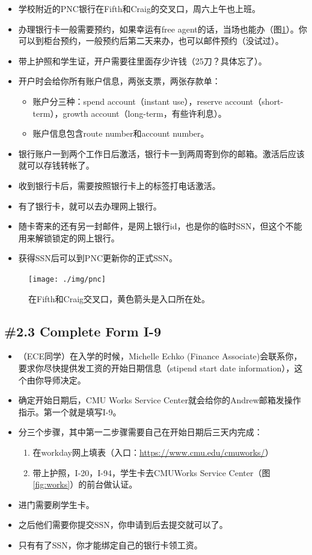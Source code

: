 \documentclass[letterpaper,10pt]{article}
\begin{document}
	\begin{itemize}
		\item 学校附近的PNC银行在Fifth和Craig的交叉口，周六上午也上班。
		\item 办理银行卡一般需要预约，如果幸运有free agent的话，当场也能办（图\ref{fig:pnc}）。你可以到柜台预约，一般预约后第二天来办，也可以邮件预约（没试过）。
		\item 带上护照和学生证，开户需要往里面存少许钱（25刀？具体忘了）。
		\item 开户时会给你所有账户信息，两张支票，两张存款单：
		\begin{itemize}
			\item 账户分三种：spend account（instant use），reserve account（short-term），growth account（long-term，有些许利息）。
			\item 账户信息包含route number和account number。
		\end{itemize}
		\item 银行账户一到两个工作日后激活，银行卡一到两周寄到你的邮箱。激活后应该就可以存钱转帐了。
		\item 收到银行卡后，需要按照银行卡上的标签打电话激活。
		\item 有了银行卡，就可以去办理网上银行。
		\item 随卡寄来的还有另一封邮件，是网上银行id，也是你的临时SSN，但这个不能用来解锁锁定的网上银行。
		\item 获得SSN后可以到PNC更新你的正式SSN。
	\end{itemize}
	
	\begin{figure}[!h]
		\centering
		\texttt{[image: ./img/pnc]}
		\caption{在Fifth和Craig交叉口，黄色箭头是入口所在处。}
		\label{fig:pnc}
	\end{figure}
	
	\subsection*{\#2.3 Complete Form I-9}
	
	\begin{itemize}
		\item （ECE同学）在入学的时候，Michelle Echko (Finance Associate)会联系你，要求你尽快提供发工资的开始日期信息（stipend start date information），这个由你导师决定。
		\item 确定开始日期后，CMU Works Service Center就会给你的Andrew邮箱发操作指示。第一个就是填写I-9。
		\item 分三个步骤，其中第一二步骤需要自己在开始日期后三天内完成：
		\begin{enumerate}
			\item 在workday网上填表（入口：\url{https://www.cmu.edu/cmuworks/}）
			\item 带上护照，I-20，I-94，学生卡去CMUWorks Service Center（图\ref{fig:works}）的前台做认证。
		\end{enumerate}
		\item 进门需要刷学生卡。
		\item 之后他们需要你提交SSN，你申请到后去提交就可以了。
		\item 只有有了SSN，你才能绑定自己的银行卡领工资。
	\end{itemize}
	
\end{document}
